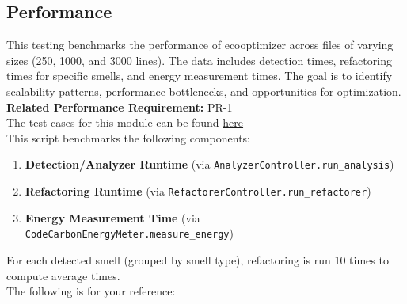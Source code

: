 \documentclass[12pt, titlepage]{article}
\begin{document}
\subsection{Performance}

This testing benchmarks the performance of ecooptimizer across
files of varying sizes (250, 1000, and 3000 lines). The data includes
detection times, refactoring times for specific smells, and energy measurement times.
The goal is to identify scalability patterns, performance bottlenecks, and
opportunities for optimization.\\

\textbf{Related Performance Requirement:} PR-1\\

\noindent The test cases for this module can be found
\href{https://github.com/ssm-lab/capstone--source-code-optimizer/blob/new-poc/tests/benchmarking/benchmark.py}{here}\\

This script benchmarks the following components:

\begin{enumerate}
  \item \textbf{Detection/Analyzer Runtime} (via
    \texttt{AnalyzerController.run\_analysis})
  \item \textbf{Refactoring Runtime} (via
    \texttt{RefactorerController.run\_refactorer})
  \item \textbf{Energy Measurement Time} (via
    \texttt{CodeCarbonEnergyMeter.measure\_energy})
\end{enumerate}

For each detected smell (grouped by smell type), refactoring is run
10 times to compute average times.\\

\noindent The following is for your reference: \\
\end{document}
